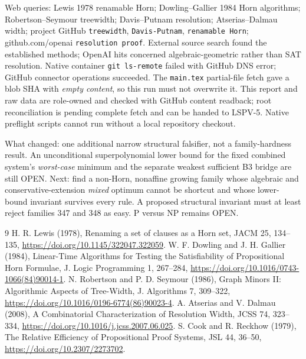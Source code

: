 \documentclass[11pt]{article}
\begin{document}
Web queries: Lewis 1978 renamable Horn; Dowling--Gallier 1984 Horn algorithms; Robertson--Seymour treewidth; Davis--Putnam resolution; Atserias--Dalmau width; project GitHub \texttt{treewidth}, \texttt{Davis-Putnam}, \texttt{renamable Horn}; github.com/openai \texttt{resolution proof}. External source search found the established methods; OpenAI hits concerned algebraic-geometric rather than SAT resolution. Native container \texttt{git ls-remote} failed with GitHub DNS error; GitHub connector operations succeeded. The \texttt{main.tex} partial-file fetch gave a blob SHA with \emph{empty content}, so this run must not overwrite it. This report and raw data are role-owned and checked with GitHub content readback; root reconciliation is pending complete fetch and can be handed to LSPV-5. Native preflight scripts cannot run without a local repository checkout.

What changed: one additional narrow structural falsifier, not a family-hardness result. An unconditional superpolynomial lower bound for the fixed combined system's \emph{worst-case} minimum and the separate weakest sufficient B3 bridge are still OPEN. Next: find a non-Horn, nonaffine growing family whose algebraic and conservative-extension \emph{mixed} optimum cannot be shortcut and whose lower-bound invariant survives every rule. A proposed structural invariant must at least reject families 347 and 348 as easy. P versus NP remains OPEN.

\begin{thebibliography}{9}
 H. R. Lewis (1978), Renaming a set of clauses as a Horn set, JACM 25, 134--135, \url{https://doi.org/10.1145/322047.322059}.
 W. F. Dowling and J. H. Gallier (1984), Linear-Time Algorithms for Testing the Satisfiability of Propositional Horn Formulae, J. Logic Programming 1, 267--284, \url{https://doi.org/10.1016/0743-1066(84)90014-1}.
 N. Robertson and P. D. Seymour (1986), Graph Minors II: Algorithmic Aspects of Tree-Width, J. Algorithms 7, 309--322, \url{https://doi.org/10.1016/0196-6774(86)90023-4}.
 A. Atserias and V. Dalmau (2008), A Combinatorial Characterization of Resolution Width, JCSS 74, 323--334, \url{https://doi.org/10.1016/j.jcss.2007.06.025}.
 S. Cook and R. Reckhow (1979), The Relative Efficiency of Propositional Proof Systems, JSL 44, 36--50, \url{https://doi.org/10.2307/2273702}.
\end{thebibliography}
\end{document}
